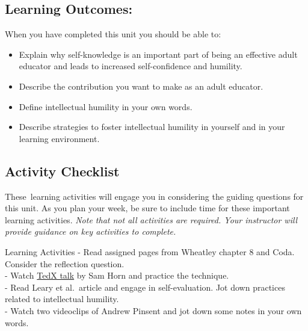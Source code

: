 \documentclass[
]{book}
\providecommand{\tightlist}{%
  \setlength{\itemsep}{0pt}\setlength{\parskip}{0pt}}
\begin{document}
\hypertarget{learning-outcomes-8}{%
\subsection*{Learning Outcomes:}\label{learning-outcomes-8}}

When you have completed this unit you should be able to:

\begin{itemize}
\tightlist
\item
  Explain why self-knowledge is an important part of being an effective adult educator and leads to increased self-confidence and humility.\\
\item
  Describe the contribution you want to make as an adult educator.\\
\item
  Define intellectual humility in your own words.\\
\item
  Describe strategies to foster intellectual humility in yourself and in your learning environment.
\end{itemize}

\hypertarget{activity-checklist-8}{%
\subsection*{Activity Checklist}\label{activity-checklist-8}}

These~learning activities will engage you in considering the guiding questions for this unit. As you plan your week, be sure to include time for these important learning activities. \emph{Note that not all activities are required. Your instructor will provide guidance on key activities to complete.}

\begin{reflect}
{Learning Activities}
- Read assigned pages from Wheatley chapter 8 and Coda. Consider the reflection question.\\
- Watch \href{https://youtu.be/Xlg8zdSVjgg}{TedX talk} by Sam Horn and practice the technique.\\
- Read Leary et al.~article and engage in self-evaluation. Jot down practices related to intellectual humility.\\
- Watch two videoclips of Andrew Pinsent and jot down some notes in your own words.
\end{reflect}
\end{document}
